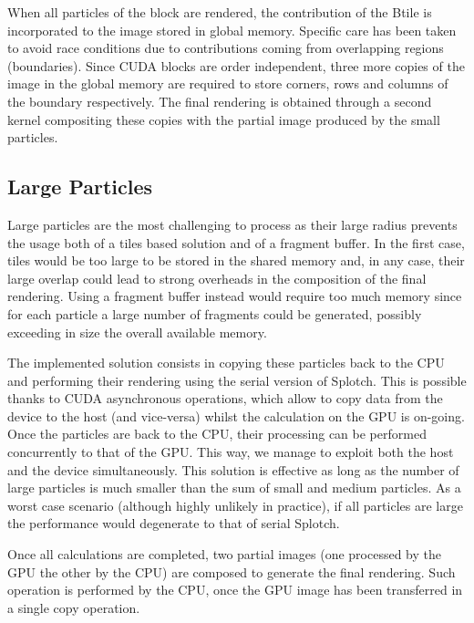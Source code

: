 \documentclass[preprint,5pt]{elsarticle}
\begin{document}
When all particles of the block are rendered, the contribution of the Btile is incorporated to the image stored in global memory. Specific care has been taken to avoid race conditions due to contributions coming
from overlapping regions (boundaries). Since CUDA blocks are order independent, three more copies of the image in the global memory are required to store corners, rows and columns of the boundary respectively. The final rendering is obtained through a second kernel compositing these copies with the partial image produced by the small particles.  

\subsection{Large Particles}
\label{sec:largeparticles}
Large particles are the most challenging to process as their large
radius prevents the usage both of a tiles based solution and of a fragment buffer.
In the first case, tiles would be too large to be stored in the shared memory
and, in any case, their large overlap could lead to strong overheads in the composition of the
final rendering. Using a fragment buffer instead would require too much memory since
for each particle a large number of fragments could be generated, possibly
exceeding in size the overall available memory.

The implemented solution consists in copying these particles back to the CPU and performing their rendering
using the serial version of Splotch. This is possible thanks to CUDA asynchronous
operations, which allow to copy data from the device to the host (and vice-versa)
whilst the calculation on the GPU is on-going. Once the particles are back to the CPU,
their processing can be performed concurrently to that of the GPU.  
This way, we manage to exploit both the host and the device simultaneously.
This solution is effective as long as the number of large particles
is much smaller than the sum of small and medium particles. As a worst case scenario (although highly unlikely in practice), if all particles are large the performance would degenerate to that of serial Splotch.

Once all calculations are completed, two partial images (one processed by the GPU the other by the CPU) are composed to generate the final rendering. Such operation is performed by the CPU, once the GPU image has been transferred in a single copy operation. 
\end{document}
